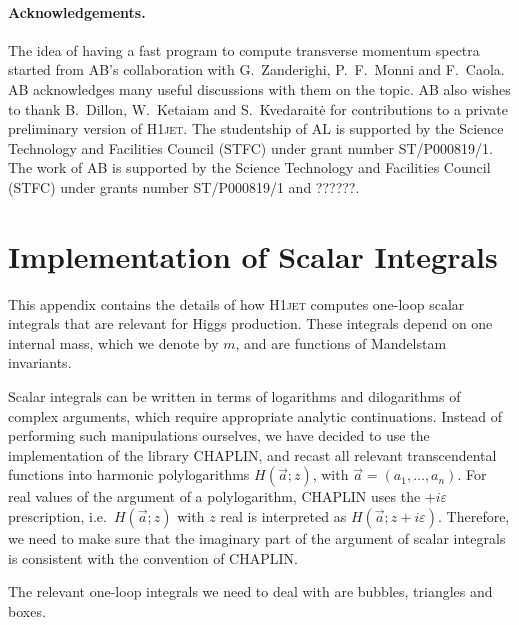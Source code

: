 \documentclass[12pt]{article}
\begin{document}
\paragraph{Acknowledgements.} The idea of having a fast program to
compute transverse momentum spectra started from AB's collaboration
with G.~Zanderighi, P.~F.~Monni and F.~Caola. AB
acknowledges many useful discussions with them on the topic. AB also
wishes to thank B.~Dillon, W.~Ketaiam and S.~Kvedarait\.e for contributions to a
private preliminary version of \textsc{H1jet}. The studentship of AL is
supported by the Science Technology and Facilities Council (STFC)
under grant number ST/P000819/1. The work of AB is supported by the
Science Technology and Facilities Council (STFC) under grants number
ST/P000819/1 and ??????.

\appendix

\section{Implementation of Scalar Integrals}
\label{sec:scalar-integrals}

This appendix contains the details of how \textsc{H1jet} computes one-loop
scalar integrals that are relevant for Higgs production. These
integrals depend on one internal mass, which we denote by $m$, and are
functions of Mandelstam
invariants.

Scalar integrals can be written in terms of logarithms and dilogarithms of complex
arguments, which require appropriate analytic continuations. Instead of performing such manipulations ourselves, we have
decided to use the implementation of the library CHAPLIN, and recast all relevant transcendental
functions into harmonic polylogarithms $H(\vec a;z)$, with
$\vec a=(a_1,\dots,a_n)$. For real values of the argument of a polylogarithm, CHAPLIN
uses the $+i\varepsilon$ prescription, i.e.\ $H(\vec a;z)$ with $z$
real is interpreted as $H(\vec a;z+i\varepsilon)$. Therefore, we need
to make sure that the imaginary part of the argument of scalar
integrals is consistent with the convention of CHAPLIN.

The relevant one-loop integrals we need to deal with are  
bubbles, triangles and boxes.
\end{document}
